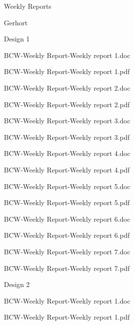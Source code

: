 \documentclass[conference]{IEEEtran}
\begin{document}
         
        
    \indent Weekly Reports 
    
        \indent \indent Gerhort 
        
            \indent \indent \indent Design 1 
            
               \indent \indent \indent \indent  BCW-Weekly Report-Weekly report 1.doc 
                
                \indent \indent \indent \indent BCW-Weekly Report-Weekly report 1.pdf 
                
               \indent \indent \indent \indent  BCW-Weekly Report-Weekly report 2.doc 
                
               \indent \indent \indent \indent  BCW-Weekly Report-Weekly report 2.pdf 
                
                \indent \indent \indent \indent BCW-Weekly Report-Weekly report 3.doc 
                
                \indent \indent \indent \indent BCW-Weekly Report-Weekly report 3.pdf 
                
                \indent \indent \indent \indent BCW-Weekly Report-Weekly report 4.doc 
                
               \indent \indent \indent \indent  BCW-Weekly Report-Weekly report 4.pdf 
                
                \indent \indent \indent \indent BCW-Weekly Report-Weekly report 5.doc 
                
               \indent \indent \indent \indent  BCW-Weekly Report-Weekly report 5.pdf 
                
                \indent \indent \indent \indent BCW-Weekly Report-Weekly report 6.doc 
                
                \indent \indent \indent \indent BCW-Weekly Report-Weekly report 6.pdf 
                
                \indent \indent \indent \indent BCW-Weekly Report-Weekly report 7.doc 
                
                \indent \indent \indent \indent BCW-Weekly Report-Weekly report 7.pdf 
                
            \indent \indent \indent Design 2 
            
               \indent \indent \indent \indent  BCW-Weekly Report-Weekly report 1.doc 
                
               \indent \indent \indent \indent  BCW-Weekly Report-Weekly report 1.pdf 
                
\end{document}
